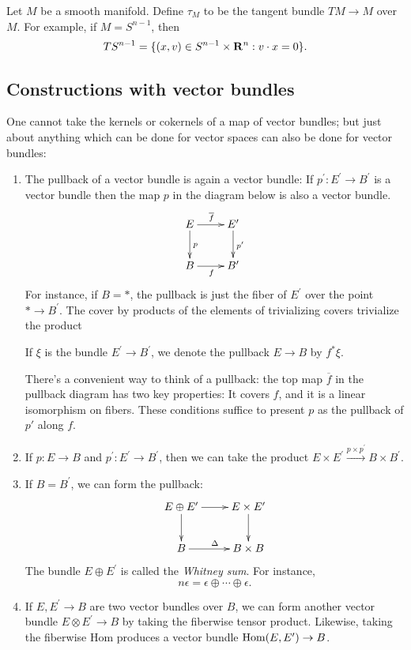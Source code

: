 \begin{example}
Let $M$ be a smooth manifold. Define $\tau_M$ to be the tangent
	bundle $TM\to M$ over $M$. For example, if $M = S^{n-1}$, then
	$$TS^{n-1} = \{(x,v)\in S^{n-1}\times\mathbf R^n:v\cdot x = 0\}.$$
\end{example}

\subsection{Constructions with vector bundles}
One cannot take the kernels or cokernels of a map of vector bundles; 
but just about
anything which can be done for vector spaces can also be done for vector
bundles:
\begin{enumerate}
    \item The pullback of a vector bundle is again a vector bundle:
If $p^\prime:E^\prime\to B^\prime$ is a vector bundle then the
	 map $p$ in the diagram below is also a vector bundle.
	\begin{equation*}
	    \xymatrix{
		E\ar[r]^{\overline f} \ar[d]^p & E^\prime\ar[d]^{p^\prime}\\
		B\ar[r]_f & B^\prime
		}
	\end{equation*}
	For instance, if $B=\ast$, the pullback is just the fiber of $E^\prime$
	over the point $\ast\to B^\prime$. The cover by products of the 
elements of trivializing covers trivialize the product

 If $\xi$ is the bundle $E^\prime\to
	B^\prime$, we denote the pullback $E\to B$ by $f^\ast \xi$.

There's a convenient way to think of a pullback: the top map $\overline{f}$
in the pullback diagram has two key properties: It covers $f$, and it is a
linear isomorphism on fibers. These conditions suffice to present $p$ as 
the pullback of $p'$ along $f$. 
    \item If $p:E\to B$ and $p^\prime:E^\prime\to B^\prime$, then we can take
	the product $E\times E^\prime\xrightarrow{p\times p^\prime}B\times
	B^\prime$. 
    \item If $B=B^\prime$, we can form the pullback:
	\begin{equation*}
	    \xymatrix{
		E\oplus E^\prime\ar[r]\ar[d] & E\times E^\prime\ar[d]\\
		B\ar[r]^{\Delta} & B\times B
		}
	\end{equation*}
	The bundle $E\oplus E^\prime$ is called the \emph{Whitney sum}. For
	instance, 
	$$n\epsilon = \epsilon\oplus\cdots\oplus\epsilon.$$
    \item If $E,E^\prime\to B$ are two vector bundles over $B$, we can form
	another vector bundle $E\otimes E^\prime\to B$ by taking the
	fiberwise tensor product. Likewise, taking the fiberwise Hom 
produces a
	vector bundle $\operatorname{Hom}(E,E^\prime)\to B$.
\end{enumerate}


